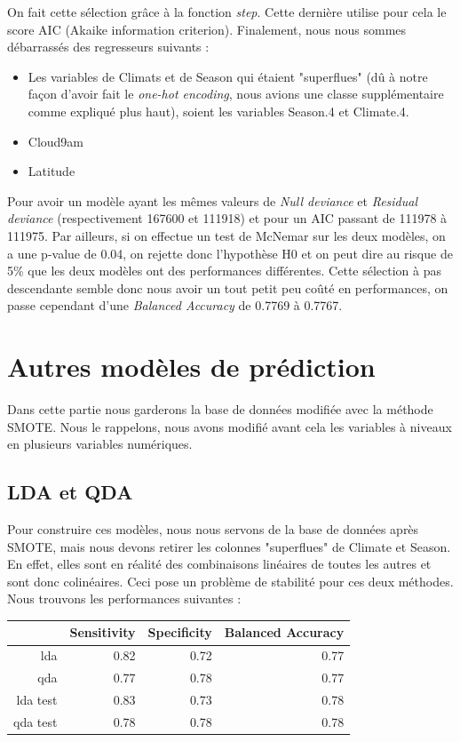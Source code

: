\documentclass{article}
\begin{document}
On fait cette sélection grâce à la fonction \emph{step}. Cette dernière utilise pour cela le score AIC (Akaike information criterion). Finalement, nous nous sommes débarrassés des regresseurs suivants : 
\begin{itemize}
    \item Les variables de Climats et de Season qui étaient "superflues" (dû à notre façon d'avoir fait le \emph{one-hot encoding}, nous avions une classe supplémentaire comme expliqué plus haut), soient les variables Season.4 et Climate.4. 
    \item Cloud9am
    \item Latitude
\end{itemize}
Pour avoir un modèle ayant les mêmes valeurs de \emph{Null deviance} et \emph{Residual deviance} (respectivement 167600 et 111918) et pour un AIC passant de 111978 à 111975. Par ailleurs, si on effectue un test de McNemar sur les deux modèles, on a une p-value de 0.04, on rejette donc l'hypothèse H0 et on peut dire au risque de 5\% que les deux modèles ont des performances différentes. Cette sélection à pas descendante semble donc nous avoir un tout petit peu coûté en performances, on passe cependant d'une \emph{Balanced Accuracy} de 0.7769 à 0.7767.

\section{Autres modèles de prédiction}

Dans cette partie nous garderons la base de données modifiée avec la méthode SMOTE. Nous le rappelons, nous avons modifié avant cela les variables à niveaux en plusieurs variables numériques. 

\subsection{LDA et QDA}

Pour construire ces modèles, nous nous servons de la base de données après SMOTE, mais nous devons retirer les colonnes "superflues" de Climate et Season. En effet, elles sont en réalité des combinaisons linéaires de toutes les autres et sont donc colinéaires. Ceci pose un problème de stabilité pour ces deux méthodes. Nous trouvons les performances suivantes : 
\begin{table}[ht]
    \centering
    \begin{tabular}{|r|rrr|}
        \hline
        & Sensitivity & Specificity & Balanced Accuracy \\ 
        \hline
        lda & 0.82 & 0.72 & 0.77 \\ 
        qda & 0.77 & 0.78 & 0.77 \\ 
        \hline
        \hline
        lda test & 0.83 & 0.73 & 0.78 \\ 
        qda test & 0.78 & 0.78 & 0.78 \\ 
        \hline
    \end{tabular}
\end{table}
\end{document}
